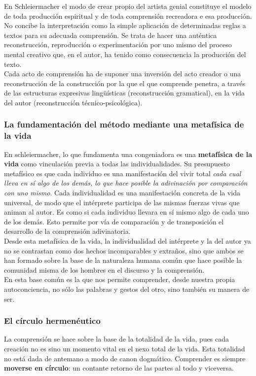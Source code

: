 \documentclass[a4paper, 11pt, twocolumn, spanish]{article}
\begin{document}
En Schleiermacher el modo de crear propio del artista genial
constituye el modelo de toda producción espiritual y de toda
comprensión recreadora e esa producción. No concibe la interpretación
como la simple aplicación de determinadas reglas a textos para su
adecuada comprensión. Se trata de hacer una auténtica reconstrucción,
reproducción o experimentación por uno mismo del proceso mental
creativo que, en el autor, ha tenido como consecuencia la producción
del texto.\\[0pt]
Cada acto de comprensión ha de suponer una inversión del acto creador
o una reconstrucción de la construcción por la que el que comprende
penetra, a través de las estructuras expresivas lingüísticas
(reconstrucción gramatical), en la vida del autor (reconstrucción
técnico-psicológica).

\subsubsection{La fundamentación del método mediante una metafísica de la vida}
\label{sec:org07b1be1}
En schleiermacher, lo que fundamenta una congeniadora es una
\textbf{metafísica de la vida} como vinculación previa a todas las
individualidades. Su presupuesto metafísico es que cada individuo es una
manifestación del vivir total \emph{cada cual lleva en sí algo de los
demás, lo que hace posible la adivinación por comparación con uno
mismo}. Cada individualidad es una manifestación concreta de la vida
universal, de modo que el intérprete participa de las mismas fuerzas
vivas que animan al autor. Es como si cada individuo llevara en sí
mismo algo de cada uno de los demás. Esto permite por vía de
comparación y de transposición el desarrollo de la comprensión
adivinatoria.\\[0pt]

Desde esta metafísica de la vida, la individualidad del intérprete y
la del autor ya no se contrastan como dos hechos incomparables y
extraños, sino que ambos se han formado sobre la base de la naturaleza
humana común que hace posible la comunidad misma de los hombres en el
discurso y la comprensión.\\[0pt]
En esta base común es la que nos permite comprender, desde nuestra
propia autoconciencia, no sólo las palabras y gestos del otro, sino
también su manera de ser.

\subsubsection{El círculo hermenéutico}
\label{sec:org136dfaa}
La comprensión se hace sobre la base de la totalidad de la vida, pues
cada creación no es sino un momento vital en el nexo total de la
vida. Esta totalidad no está dada de antemano a modo de canon
dogmático. Comprender es siempre \textbf{moverse en círculo}: un contante
retorno de las partes al todo y viceversa.\\[0pt]
\end{document}
